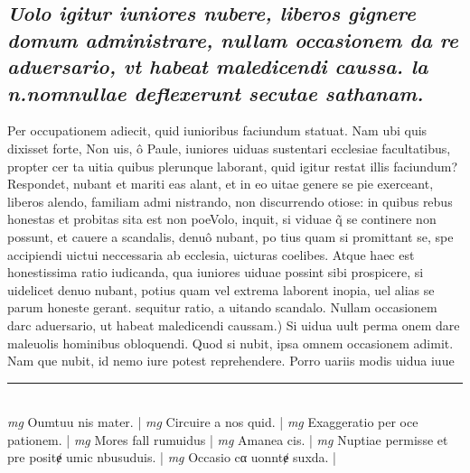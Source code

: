 \documentclass{article}
\begin{document}
\begin{pages}
\subsection*{\textit{Uolo igitur iuniores nubere, liberos gignere domum administrare, nullam occasionem da re aduersario, vt habeat maledicendi caussa. la n.nomnullae deflexerunt secutae sathanam. }}\pstart Per occupationem adiecit, quid iunioribus faciundum statuat. Nam ubi quis dixisset forte, Non uis, ô Paule, iuniores uiduas sustentari ecclesiae facultatibus, propter cer ta uitia quibus plerunque laborant, quid igitur restat illis faciundum? Respondet, nubant et mariti eas alant, et in eo uitae genere se pie exerceant, liberos alendo, familiam admi nistrando, non discurrendo otiose: in quibus rebus honestas et probitas sita est non poeVolo, inquit, si viduae q̃ se continere non possunt, et cauere a scandalis, denuô nubant, po tius quam si promittant se, spe accipiendi uictui neccessaria ab ecclesia, uicturas coelibes. Atque haec est honestissima ratio iudicanda, qua iuniores uiduae possint sibi prospicere, si uidelicet denuo nubant, potius quam vel extrema laborent inopia, uel alias se parum honeste gerant. sequitur ratio, a uitando scandalo.  \pend\pstart Nullam occasionem darc aduersario, ut habeat maledicendi caussam.) Si uidua uult perma  onem dare maleuolis hominibus obloquendi. Quod si nubit, ipsa omnem occasionem adimit. Nam que nubit, id nemo iure potest reprehendere. Porro uariis modis uidua iuue  \pend
\vspace{0.5cm}\noindent
\vspace{0.2cm}\rule{1cm}{0.2pt}\\ 
\hspace{0.2cm}\textit{mg}
\footnotesize Oumtuu nis mater. 
\normalsize| 
\hspace{0.2cm}\textit{mg}
\footnotesize Circuire a nos quid. 
\normalsize| 
\hspace{0.2cm}\textit{mg}
\footnotesize Exaggeratio per oce pationem. 
\normalsize| 
\hspace{0.2cm}\textit{mg}
\footnotesize Mores fall rumuidus 
\normalsize| 
\hspace{0.2cm}\textit{mg}
\footnotesize Amanea cis. 
\normalsize| 
\hspace{0.2cm}\textit{mg}
\footnotesize Nuptiae permisse et pre positɇ umic nbusuduis. 
\normalsize| 
\hspace{0.2cm}\textit{mg}
\footnotesize Occasio cα uonntɇ suxda. 
\normalsize| 

\end{pages}
\end{document}
